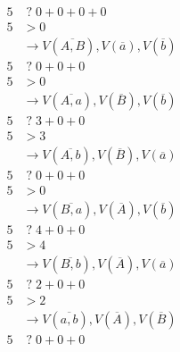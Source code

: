 \documentclass{article}
\newcommand*{\unknown}[0]{\;?\;}
\begin{document}
\begin{enumerate}
\begin{enumerate}
\begin{align*}
    5                        &\unknown    0              + 0              + 0              + 0 \\
    5                        &>           0                                   \\
                             &\rightarrow V(\overline{A, B}), V(\overline{a}), V(\overline{b}) \\
    5                        &\unknown    0                 + 0              + 0               \\
    5                        &>           0                                                    \\
                             &\rightarrow V(\overline{A, a}), V(\overline{B}), V(\overline{b}) \\
    5                        &\unknown    3                 + 0              + 0               \\
    5                        &>           3                                                    \\
                             &\rightarrow V(\overline{A, b}), V(\overline{B}), V(\overline{a}) \\
    5                        &\unknown    0                 + 0              + 0               \\
    5                        &>           0                                                    \\
                             &\rightarrow V(\overline{B, a}), V(\overline{A}), V(\overline{b}) \\
    5                        &\unknown    4                 + 0              + 0               \\
    5                        &>           4                                                    \\
                             &\rightarrow V(\overline{B, b}), V(\overline{A}), V(\overline{a}) \\
    5                        &\unknown    2                 + 0              + 0               \\
    5                        &>           2                                                    \\
                             &\rightarrow V(\overline{a, b}), V(\overline{A}), V(\overline{B}) \\
    5                        &\unknown    0                 + 0              + 0               \\

\end{align*}
\end{enumerate}
\end{enumerate}
\end{document}
